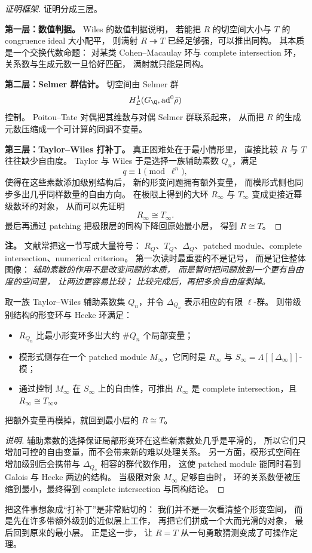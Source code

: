 \begin{proof}[证明框架]
证明分成三层。

\textbf{第一层：数值判据。}
Wiles 的数值判据说明，
若能把 $R$ 的切空间大小与 $T$ 的 congruence ideal 大小配平，
则满射 $R\twoheadrightarrow T$ 已经足够强，可以推出同构。
其本质是一个交换代数命题：
对某类 Cohen--Macaulay 环与 complete intersection 环，
关系数与生成元数一旦恰好匹配，
满射就只能是同构。

\textbf{第二层：Selmer 群估计。}
切空间由 Selmer 群
\[
  H^1_{\mathcal L}(G_\Q,\mathrm{ad}^0\rhobar)
\]
控制。
Poitou--Tate 对偶把其维数与对偶 Selmer 群联系起来，
从而把 $R$ 的生成元数压缩成一个可计算的同调不变量。

\textbf{第三层：Taylor--Wiles 打补丁。}
真正困难处在于最小情形里，
直接比较 $R$ 与 $T$ 往往缺少自由度。
Taylor 与 Wiles 于是选择一族辅助素数 $Q_n$，满足
\[
  q\equiv 1\pmod{\ell^n},
\]
使得在这些素数添加级别结构后，
新的形变问题拥有额外变量，
而模形式侧也同步多出几乎同样数量的自由方向。
在极限上得到的大环 $R_\infty$ 与 $T_\infty$ 变成更接近幂级数环的对象，
从而可以先证明
\[
  R_\infty\cong T_\infty.
\]
最后再通过 patching 把极限层的同构下降回原始最小层，
得到 $R\cong T$。
\end{proof}

\textbf{注。}
文献常把这一节写成大量符号：
$R_Q$、$T_Q$、$\Delta_Q$、patched module、complete intersection、numerical criterion。
第一次读时最重要的不是记号，
而是记住整体图像：
\emph{辅助素数的作用不是改变问题的本质，
而是暂时把问题放到一个更有自由度的空间里，
让两边更容易比较；
比较完成后，再把多余自由度剥掉。}

\begin{proposition}
\label{prop:ch10-patching-details}
取一族 Taylor--Wiles 辅助素数集 $Q_n$，并令 $\Delta_{Q_n}$ 表示相应的有限 $\ell$-群。
则带级别结构的形变环与 Hecke 环满足：
\begin{itemize}
  \item $R_{Q_n}$ 比最小形变环多出大约 $\#Q_n$ 个局部变量；
  \item 模形式侧存在一个 patched module $M_\infty$，它同时是 $R_\infty$ 与 $S_\infty=\Lambda[[\Delta_\infty]]$-模；
  \item 通过控制 $M_\infty$ 在 $S_\infty$ 上的自由性，可推出 $R_\infty$ 是 complete intersection，且 $R_\infty\cong T_\infty$。
\end{itemize}
把额外变量再模掉，就回到最小层的 $R\cong T$。
\end{proposition}

\begin{proof}[说明]
辅助素数的选择保证局部形变环在这些新素数处几乎是平滑的，
所以它们只增加可控的自由变量，而不会带来新的难以处理关系。
另一方面，模形式空间在增加级别后会携带与 $\Delta_{Q_n}$ 相容的群代数作用，
这使 patched module 能同时看到 Galois 与 Hecke 两边的结构。
当极限对象 $M_\infty$ 足够自由时，
环的关系数便被压缩到最小，最终得到 complete intersection 与同构结论。
\end{proof}

把这件事想象成“打补丁”是非常贴切的：
我们并不是一次看清整个形变空间，
而是先在许多带额外级别的近似层上工作，
再把它们拼成一个大而光滑的对象，
最后回到原来的最小层。
正是这一步，
让 $R=T$ 从一句勇敢猜测变成了可操作定理。
